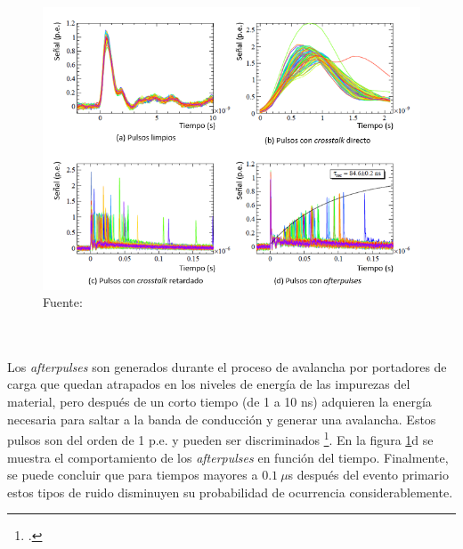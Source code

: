 \begin{figure}[h!]
\begin{centering}
    \caption{Representación de amplitud y distribución temporal de pulsos sin ruido (a), con \textit{crosstalk} directo (b), \textit{crosstalk} retardado (c)  y \textit{afterpulses} (d) en un SiPM. Adaptado de \footcite{charct_noise}. Se puede observar que después de  $0.1~\mu$s la frecuencia en los tipos de ruido disminuye considerablemente.}
    \includegraphics[width=\textwidth]{Images/Pulses_with_noise.PNG}
    \caption*{Fuente:}
    \label{fig:noise}  
  \par\end{centering}
\end{figure}
\\ \\
Los \textit{afterpulses} son generados durante el proceso de avalancha por portadores de carga que quedan atrapados en los niveles de energía de las impurezas  del material, pero después de un corto tiempo  (de 1 a 10 ns) adquieren la energía necesaria para saltar a la banda de conducción y generar una avalancha. Estos pulsos son del orden de 1 p.e. y pueden ser discriminados \footcite{MPPC_note}. En la figura   \ref{fig:noise}d se muestra el comportamiento de los \textit{afterpulses} en función del tiempo. Finalmente, se puede concluir que para tiempos mayores a $0.1~\mu$s después del evento primario estos tipos de ruido disminuyen su probabilidad de ocurrencia considerablemente.       
